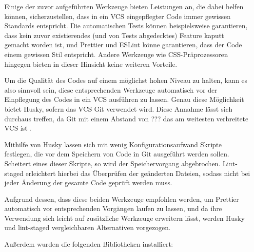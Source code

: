 \begin{itemize}
Einige der zuvor aufgeführten Werkzeuge bieten Leistungen an, die dabei helfen können, sicherzustellen, dass in ein \gls{VCS} eingepflegter Code immer gewissen Standards entspricht. Die automatischen Tests können beispielsweise garantieren, dass kein zuvor existierendes (und von Tests abgedecktes) Feature kaputt gemacht worden ist, und Prettier und ESLint könne garantieren, dass der Code einem gewissen Stil entspricht. Andere Werkzeuge wie CSS-Präprozessoren hingegen bieten in dieser Hinsicht keine weiteren Vorteile.

Um die Qualität des Codes auf einem möglichst hohen Niveau zu halten, kann es also sinnvoll sein, diese entsprechenden Werkzeuge automatisch vor der Einpflegung des Codes in ein \gls{VCS} ausführen zu lassen. Genau diese Möglichkeit bietet Husky, sofern das \gls{VCS} Git verwendet wird. Diese Annahme lässt sich durchaus treffen, da Git mit einem Abstand von ??? das am weitesten verbreitete \gls{VCS} ist \missingQuote.

Mithilfe von Husky lassen sich mit wenig Konfigurationsaufwand Skripte festlegen, die vor dem Speichern von Code in Git ausgeführt werden sollen. Scheitert eines dieser Skripte, so wird der Speichervorgang abgebrochen. Lint-staged erleichtert hierbei das Überprüfen der geänderten Dateien, sodass nicht bei jeder Änderung der gesamte Code geprüft werden muss.

Aufgrund dessen, dass diese beiden Werkzeuge empfohlen werden, um Prettier automatisch vor entsprechenden Vorgängen laufen zu lassen, und da ihre Verwendung sich leicht auf zusätzliche Werkzeuge erweitern lässt, werden Husky und lint-staged vergleichbaren Alternativen vorgezogen.
\end{itemize}

Außerdem wurden die folgenden Bibliotheken installiert:

